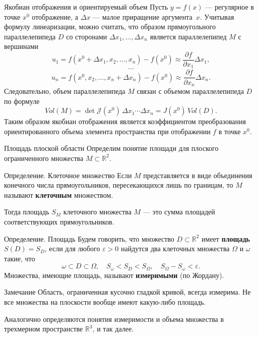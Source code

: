 \documentclass[8pt]{beamer}
\newcommand{\pp}[2]{\frac{\partial #1}{\partial #2}}
\begin{document}
\begin{frame}{Якобиан отображения и ориентируемый объем}
Пусть $y = f(x)$ --- регулярное в точке $x^0$ отображение, а $\Delta x$ --- малое приращение аргумента~$x$. Учитывая формулу линеаризации, можно считать, что образом прямоугольного параллелепипеда $D$ со сторонами $\Delta x_1,\ldots,\Delta x_n$ является параллелепипед $M$ с вершинами 
$$u_1=f(x^0+\Delta x_1,x_2,\ldots,x_n)-f(x^0) \approx \pp{f}{x_1}\Delta x_1,$$
$$\ldots$$
$$ u_n = f(x^0,x_2,\ldots,x_n+\Delta x_n)-f(x^0) \approx \pp{f}{x_n}\Delta x_n.$$
Следовательно, объем параллелепипеда $M$ связан с объемом параллелепипеда $D$ по формуле
$$Vol(M) = \det\mathcal{J}(x^0)\, \Delta x_1\cdots\Delta x_n = J(x^0)\, Vol(D).$$
Таким образом якобиан отображения является коэффициентом преобразования ориентированного объема элемента пространства при отображении $f$ в точке $x^0$.
\end{frame}

\begin{frame}{Площадь плоской области}
Определим понятие площади для плоского ограниченного множества $M\subset\mathbb{R}^2$.
\begin{block}{Определение. Клеточное множество}
Если $M$ представляется в виде объединения конечного числа прямоугольников, пересекающихся лишь по границам, то $M$ называют {\bf клеточным} множеством. 
\end{block}
Тогда площадь $S_M$ клеточного множества $M$ --- это сумма площадей соответствующих прямоугольников. 
\begin{block}{Определение. Площадь}
Будем говорить, что множество $D\subset\mathbb{R}^2$ имеет {\bf площадь} $S(D) = S_D$, если для любого $\varepsilon>0$ найдутся два клеточных множества $\Omega$ и $\omega$ такие, что 
$$\omega\subset D \subset \Omega,\quad S_\omega<S_D<S_\Omega,\quad S_\Omega-S_\omega<\varepsilon.$$
Множества, имеющие площадь, называют {\bf измеримыми} (по Жордану).
\end{block}
\begin{block}{Замечание}
Область, ограниченная кусочно гладкой кривой, всегда измерима. Не все множества на плоскости вообще имеют какую-либо площадь.
\end{block}
Аналогично определяются понятия измеримости и объема множества в трехмерном пространстве $\mathbb{R}^3$, и так далее.
\end{frame}
\end{document}
